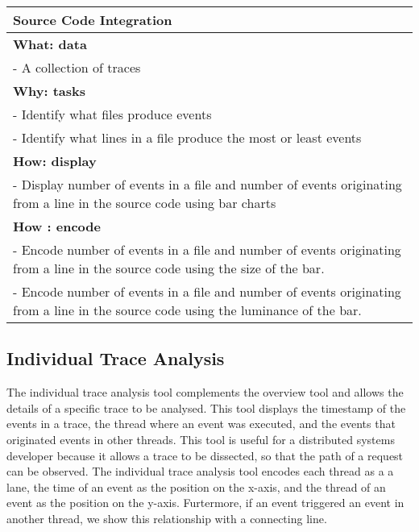 \begin{center}
    \begin{tabular}{|p{}|}
        \hline
        \textbf{Source Code Integration}                                 \\
        \hline
        \textbf{What: data}                                              \\
        - A collection of traces                                         \\
        \hline
        \textbf{Why: tasks}                                              \\
        - Identify what files produce events                             \\
        - Identify what lines in a file produce the most or least events \\
        \hline
        \textbf{How: display}                                            \\
        - Display number of events in a file and number of events originating from a
        line in the source code using bar charts                         \\
        \textbf{How : encode}                                            \\
        - Encode number of events in a file and number of events originating from a line in the source code using the
        size of the bar.                                                 \\
        - Encode number of events in a file and number of events originating from a line in the source code using the
        luminance of the bar.                                            \\
        \hline
    \end{tabular}
\end{center}


\subsection{Individual Trace Analysis}

The individual trace analysis tool complements the overview tool and allows the details of a specific trace to be analysed.
This tool displays the timestamp of the events in a trace,
the thread where an event was executed, and the events that originated events in other threads. This tool is useful for a distributed systems
developer because it allows a trace to be dissected, so that the path of a request can be observed. The individual trace analysis tool
encodes each thread as a a lane, the time of an event as the position on the x-axis, and the thread of an event as the position on the y-axis. Furtermore,
if an event triggered an event in another thread, we show this relationship with a connecting line.

